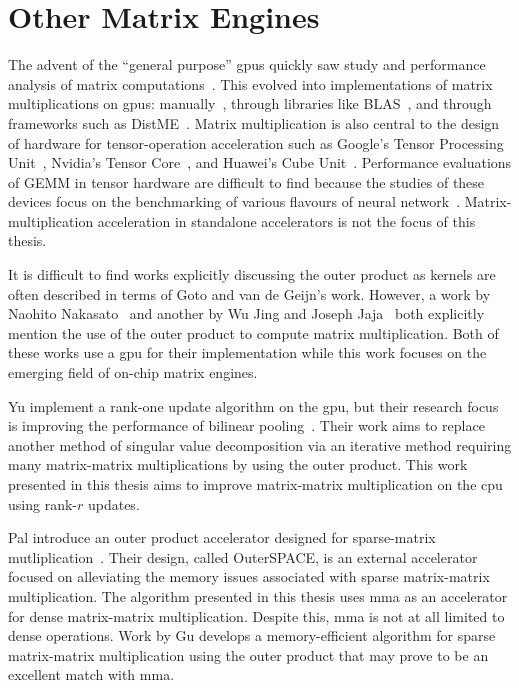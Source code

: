 \documentclass[\main/thesis.tex]{subfiles}
\begin{document}
\section{Other Matrix Engines}
The advent of the ``general purpose'' \glspl{gpu} quickly saw study and performance analysis of matrix computations~\autocite{larsen2001fast,fatahalian2004understanding}.
This evolved into implementations of matrix multiplications on \glspl{gpu}: manually~\autocite{li2011strassens}, through libraries like BLAS~\autocite{nath2011accelerating}, and through frameworks such as DistME~\autocite{han2019distme}.
Matrix multiplication is also central to the design of hardware for tensor-operation acceleration such as Google's Tensor Processing Unit~\autocite{jouppi2017datacenter}, Nvidia's Tensor Core~\autocite{markidis2018nvidia}, and Huawei's Cube Unit~\autocite{liao2019davinci}.
Performance evaluations of GEMM in tensor hardware are difficult to find because the studies of these devices focus on the benchmarking of various flavours of neural network~\autocite{jouppi2017datacenter,wang2019benchmarking}.
Matrix-multiplication acceleration in standalone accelerators is not the focus of this thesis.

It is difficult to find works explicitly discussing the outer product as kernels are often described in terms of Goto and van de Geijn's work.
However, a work by Naohito Nakasato~\autocite{nakasato2011fast} and another by Wu Jing and Joseph Jaja~\autocite{wu2016achieving} both explicitly mention the use of the outer product to compute matrix multiplication.
Both of these works use a \gls{gpu} for their implementation while this work focuses on the emerging field of on-chip matrix engines.

Yu \etal implement a rank-one update algorithm on the \gls{gpu}, but their research focus is improving the performance of bilinear pooling~\autocite{yu2020toward}.
Their work aims to replace another method of singular value decomposition via an iterative method requiring many matrix-matrix multiplications by using the outer product.
This work presented in this thesis aims to improve matrix-matrix multiplication on the \gls{cpu} using rank-$r$ updates.

Pal \etal introduce an outer product accelerator designed for sparse-matrix mutliplication~\autocite{pal2018outerspace}.
Their design, called OuterSPACE, is an external accelerator focused on alleviating the memory issues associated with sparse matrix-matrix multiplication.
The algorithm presented in this thesis uses \gls{mma} as an accelerator for dense matrix-matrix multiplication.
Despite this, \gls{mma} is not at all limited to dense operations.
Work by Gu \etal develops a memory-efficient algorithm for sparse matrix-matrix multiplication using the outer product that may prove to be an excellent match with \gls{mma}.
\end{document}
